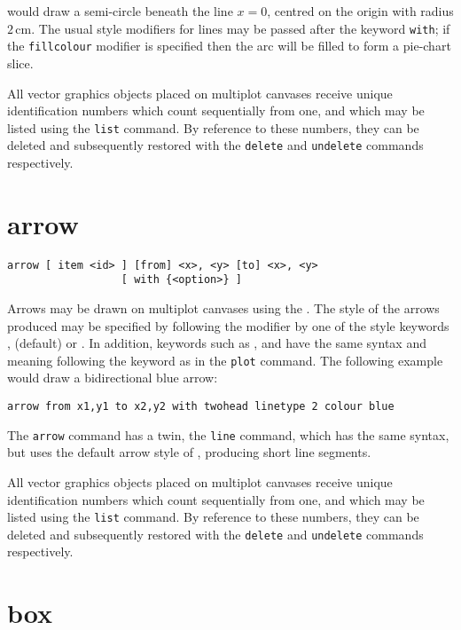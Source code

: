 \noindent would draw a semi-circle beneath the line $x=0$, centred on the
origin with radius $2\,\mathrm{cm}$.  The usual style modifiers for lines may
be passed after the keyword {\tt with}; if the {\tt fillcolour} modifier is
specified then the arc will be filled to form a pie-chart slice.

All vector graphics objects placed on multiplot canvases receive unique
identification numbers which count sequentially from one, and which may be
listed using the {\tt list} command.  By reference to these numbers, they can
be deleted and subsequently restored with the {\tt delete} and {\tt undelete}
commands respectively.


\section{arrow}

\begin{verbatim}
arrow [ item <id> ] [from] <x>, <y> [to] <x>, <y>
                  [ with {<option>} ]
\end{verbatim}

Arrows may be drawn on multiplot canvases using the . The style
of the arrows produced may be specified by following the 
modifier by one of the style keywords , 
(default) or . In addition, keywords such as ,
 and  have the same syntax and meaning
following the keyword  as in the {\tt plot} command. The
following example would draw a bidirectional blue arrow:

\begin{verbatim}
arrow from x1,y1 to x2,y2 with twohead linetype 2 colour blue
\end{verbatim}

The {\tt arrow} command has a twin, the {\tt line} command, which has the same
syntax, but uses the default arrow style of , producing short
line segments.

All vector graphics objects placed on multiplot canvases receive unique
identification numbers which count sequentially from one, and which may be
listed using the {\tt list} command.  By reference to these numbers, they can
be deleted and subsequently restored with the {\tt delete} and {\tt undelete}
commands respectively.


\section{box}


